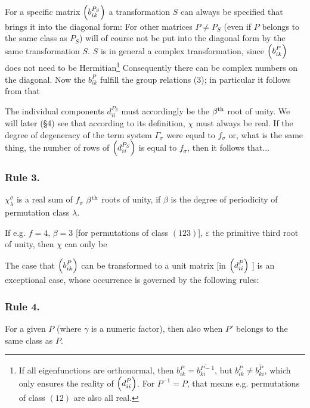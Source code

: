 \begin{paper}{1}
For a specific matrix $\Aikp{b}{ik}{P_S}$ a transformation $S$ can always be specified that brings it into the diagonal form:
For other matrices $P\neq P_S$ (even if $P$ belongs to the same class as $P_S$) will of course not be put into the diagonal form by the same transformation $S$. $S$ is in general a complex transformation, since $\Aikp{b}{ik}{P}$ does not need to be Hermitian\footnote{If all eigenfunctions are orthonormal, then $b_{ik}^P=\overline{b_{ki}^{P-1}}$, but $b_{ik}^P \neq \overline{b_{ki}^P}$, which only ensures the reality of $\Aikp{d}{ii}{P}$. For $P^{-1}=P$, that means e.g. permutations of class $(12)$ are also all real.} Consequently there can be complex numbers on the diagonal. Now the $b_{ik}^P$ fulfill the group relations (3); in particular it follows from
that

The individual components $d_{ii}^{P_S}$ must accordingly be the ${\beta}^\text{th}$ root of unity. We will later (\S 4) see that according to its definition, $\chi$ must always be real. If the degree of degeneracy of the term system $\Gamma_\sigma$ were equal to $f_\sigma$ or, what is the same thing, the number of rows of $\Aikp{d}{ii}{P_S}$ is equal to $f_\sigma$, then it follows that...

\subsubsection*{Rule 3.} $\chi_\lambda^\sigma$ is a real sum of $f_\sigma$ ${\beta}^\text{th}$ roots of unity, if $\beta$ is the degree of periodicity of permutation class $\lambda$.

If e.g. $f=4$, $\beta=3$ [for permutations of class $(123)$], $\varepsilon$ the primitive third root of unity, then $\chi$ can only be

The case that $\Aikp{b}{ik}{P}$ can be transformed to a unit matrix [in $\Aikp{d}{ii}{P}$ ] is an exceptional case, whose occurrence is governed by the following rules:

\subsubsection*{Rule 4.} For a given $P$
(where $\gamma$ is a numeric factor), then also
when $P'$ belongs to the same class as $P$.


\end{paper}
